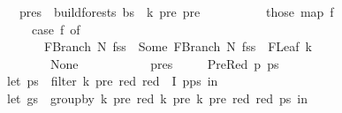 \begin{isabellebody}
\ \ \ \ \ \ \ \ \ \ pres\ {\isasymleftarrow}\ build{\isacharunderscore}{\kern0pt}forests{\isacharprime}{\kern0pt}\ bs\ {\isasymomega}\ {\isacharparenleft}{\kern0pt}k{\isacharminus}{\kern0pt}{}{\isacharparenright}{\kern0pt}\ pre\ {\isacharbraceleft}{\kern0pt}pre{\isacharbraceright}{\kern0pt}{\isacharsemicolon}{\kern0pt}\isanewline
\ \ \ \ \ \ \ \ \ \ those\ {\isacharparenleft}{\kern0pt}map\ {\isacharparenleft}{\kern0pt}{\isasymlambda}f{\isachardot}{\kern0pt}\isanewline
\ \ \ \ \ \ \ \ \ \ \ \ case\ f\ of\isanewline
\ \ \ \ \ \ \ \ \ \ \ \ \ \ FBranch\ N\ fss\ {\isasymRightarrow}\ Some\ {\isacharparenleft}{\kern0pt}FBranch\ N\ {\isacharparenleft}{\kern0pt}fss\ {\isacharat}{\kern0pt}\ {\isacharbrackleft}{\kern0pt}{\isacharbrackleft}{\kern0pt}FLeaf\ {\isacharparenleft}{\kern0pt}{\isasymomega}{\isacharbang}{\kern0pt}{\isacharparenleft}{\kern0pt}k{\isacharminus}{\kern0pt}{}{\isacharparenright}{\kern0pt}{\isacharparenright}{\kern0pt}{\isacharbrackright}{\kern0pt}{\isacharbrackright}{\kern0pt}{\isacharparenright}{\kern0pt}{\isacharparenright}{\kern0pt}\isanewline
\ \ \ \ \ \ \ \ \ \ \ \ {\isacharbar}{\kern0pt}\ {\isacharunderscore}{\kern0pt}\ {\isasymRightarrow}\ None\isanewline
\ \ \ \ \ \ \ \ \ \ {\isacharparenright}{\kern0pt}\ pres{\isacharparenright}{\kern0pt}{\isacharbraceright}{\kern0pt}{\isacharparenright}{\kern0pt}\isanewline
\ \ \ \ {\isacharbar}{\kern0pt}\ PreRed\ p\ ps\ {\isasymRightarrow}\ {\isacharparenleft}{\kern0pt}\isanewline
\ \ \ \ \ \ \ \ let\ ps{\isacharprime}{\kern0pt}\ {\isacharequal}{\kern0pt}\ filter\ {\isacharparenleft}{\kern0pt}{\isasymlambda}{\isacharparenleft}{\kern0pt}k{\isacharprime}{\kern0pt}{\isacharcomma}{\kern0pt}\ pre{\isacharcomma}{\kern0pt}\ red{\isacharparenright}{\kern0pt}{\isachardot}{\kern0pt}\ red\ {\isasymnotin}\ I{\isacharparenright}{\kern0pt}\ {\isacharparenleft}{\kern0pt}p{\isacharhash}{\kern0pt}ps{\isacharparenright}{\kern0pt}\ in\isanewline
\ \ \ \ \ \ \ \ let\ gs\ {\isacharequal}{\kern0pt}\ group{\isacharunderscore}{\kern0pt}by\ {\isacharparenleft}{\kern0pt}{\isasymlambda}{\isacharparenleft}{\kern0pt}k{\isacharprime}{\kern0pt}{\isacharcomma}{\kern0pt}\ pre{\isacharcomma}{\kern0pt}\ red{\isacharparenright}{\kern0pt}{\isachardot}{\kern0pt}\ {\isacharparenleft}{\kern0pt}k{\isacharprime}{\kern0pt}{\isacharcomma}{\kern0pt}\ pre{\isacharparenright}{\kern0pt}{\isacharparenright}{\kern0pt}\ {\isacharparenleft}{\kern0pt}{\isasymlambda}{\isacharparenleft}{\kern0pt}k{\isacharprime}{\kern0pt}{\isacharcomma}{\kern0pt}\ pre{\isacharcomma}{\kern0pt}\ red{\isacharparenright}{\kern0pt}{\isachardot}{\kern0pt}\ red{\isacharparenright}{\kern0pt}\ ps{\isacharprime}{\kern0pt}\ in\isanewline

\end{isabellebody}
